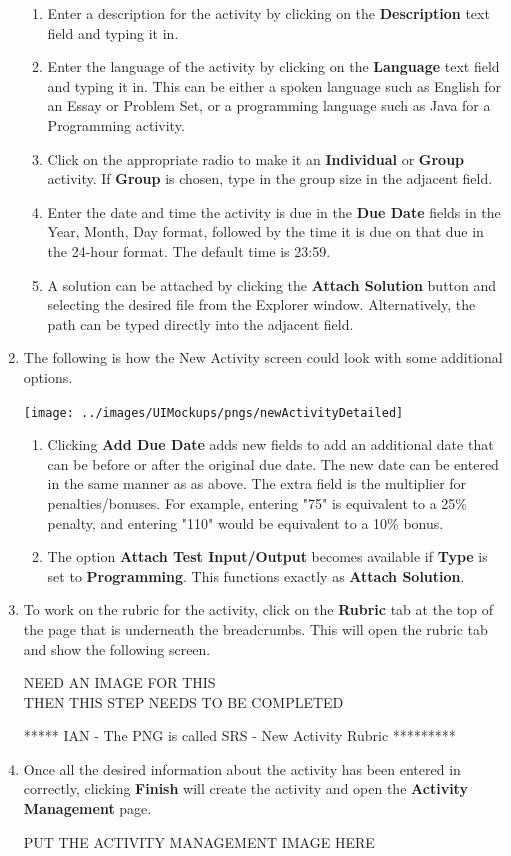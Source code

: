 \documentclass{article}
\begin{document}
\begin{enumerate}
\begin{enumerate}
  \item Enter a description for the activity by clicking on the \textbf{Description} 
  text field and typing it in.
  \item Enter the language of the activity by clicking on the \textbf{Language} text
  field and typing it in. This can be either a spoken language such as English 
  for an Essay or Problem Set, or a programming language such as Java for a Programming
  activity.
  \item Click on the appropriate radio to make it an \textbf{Individual} or 
  \textbf{Group} activity. If \textbf{Group} is chosen, type in the group size in the 
  adjacent field.
  \item Enter the date and time the activity is due in the \textbf{Due Date} fields 
  in the Year, Month, Day format, followed by the time it is due on that due in
  the 24-hour format. The default time is 23:59.
  \item A solution can be attached by clicking the \textbf{Attach Solution} button and 
  selecting the desired file from the Explorer window. Alternatively, the path can be 
  typed directly into the adjacent field.
  \end{enumerate}
  \item The following is how the New Activity screen could look with some
    additional options. 
  \begin{center} 
   \texttt{[image: ../images/UIMockups/pngs/newActivityDetailed]}
  \end{center}
  \begin{enumerate}
  \item Clicking \textbf{Add Due Date} adds new fields to add an additional
    date that can be before or after the original due date. The new date can
    be entered in the same manner as as above. The extra field is the multiplier
    for penalties/bonuses. For example, entering "75" is equivalent to a 25\%
    penalty, and entering "110" would be equivalent to a 10\% bonus.
  \item The option \textbf{Attach Test Input/Output} becomes available if \textbf{Type} 
  is set to \textbf{Programming}. This functions exactly as \textbf{Attach Solution}.
 \end{enumerate}
 \item To work on the rubric for the activity, click on the \textbf{Rubric} tab at the 
 top of the page that is underneath the breadcrumbs. This will open the rubric tab and 
 show the following screen.
 \begin{center} 
   NEED AN IMAGE FOR THIS
   \\ THEN THIS STEP NEEDS TO BE COMPLETED

***** IAN - The PNG is called SRS - New Activity Rubric *********
 \end{center}
 \item Once all the desired information about the activity has been entered
   in correctly, clicking \textbf{Finish} will create the activity and open
   the \textbf{Activity Management} page.
  \begin{center} 
    PUT THE ACTIVITY MANAGEMENT IMAGE HERE
  \end{center}
\end{enumerate}
\end{document}
